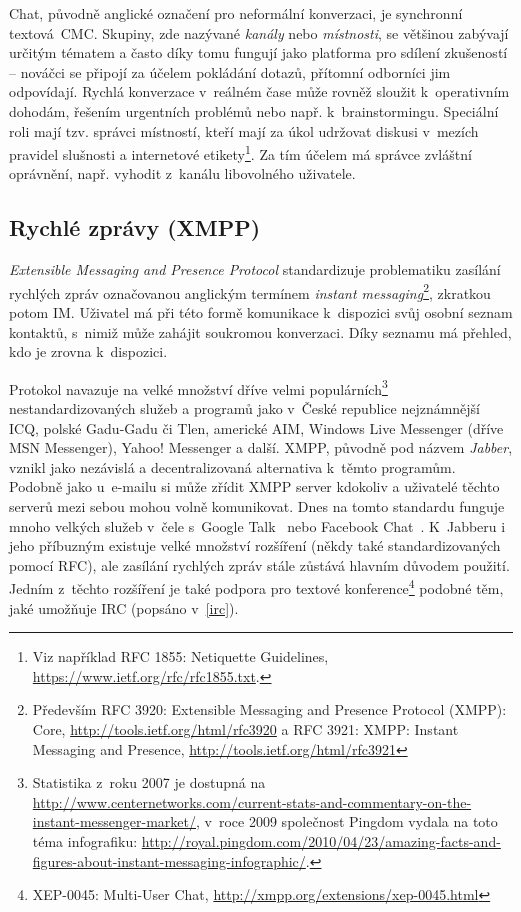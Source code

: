 \documentclass[12pt,oneside,final]{fithesis2}
\begin{document}
Chat, původně anglické označení pro neformální konverzaci, je syn\-chron\-ní tex\-to\-vá~CMC. Skupiny, zde nazývané \emph{kanály} nebo \emph{místnosti}, se většinou zabývají určitým tématem a často díky tomu fungují jako platforma pro sdílení zkušeností -- nováčci se připojí za účelem pokládání dotazů, přítomní odborníci jim odpovídají. Rychlá konverzace v~reálném čase může rovněž sloužit k~operativním dohodám, řešením urgentních problémů nebo např. k~brainstormingu. Speciální roli mají tzv. správci místností, kteří mají za úkol udržovat diskusi v~mezích pravidel slušnosti a internetové etikety\footnote{Viz například RFC 1855: Netiquette Guidelines, \url{https://www.ietf.org/rfc/rfc1855.txt}.}. Za tím účelem má správce zvláštní oprávnění, např. vyhodit z~kanálu libovolného uživatele.

\subsection{Rychlé zprávy (XMPP)}\label{xmpp}
\emph{Extensible Messaging and Presence Protocol} standardizuje problematiku zasílání rychlých zpráv označovanou anglickým termínem \emph{instant messaging}\footnote{Především RFC 3920: Extensible Messaging and Presence Protocol (XMPP): Core, \url{http://tools.ietf.org/html/rfc3920} a RFC 3921: XMPP: Instant Messaging and Presence, \url{http://tools.ietf.org/html/rfc3921}}, zkratkou potom IM. Uživatel má při této formě komunikace k~dispozici svůj osobní seznam kontaktů, s~nimiž může zahájit soukromou konverzaci. Díky seznamu má přehled, kdo je zrovna k~dispozici.

Protokol navazuje na velké množství dříve velmi populárních\footnote{Statistika z~roku 2007 je dostupná na \url{http://www.centernetworks.com/current-stats-and-commentary-on-the-instant-messenger-market/}, v~roce 2009 společnost Pingdom vydala na toto téma infografiku: \url{http://royal.pingdom.com/2010/04/23/amazing-facts-and-figures-about-instant-messaging-infographic/}.} nestandardizovaných služeb a programů jako v~České republice nejznámnější ICQ, polské Gadu-Gadu či Tlen, americké AIM, Windows Live Messenger (dříve MSN Messenger), Yahoo! Messenger a další. XMPP, původně pod názvem \emph{Jabber}, vznikl jako nezávislá a decentralizovaná alternativa k~těmto programům. Podobně jako u~e-mailu si může zřídit XMPP server kdokoliv a uživatelé těchto serverů mezi sebou mohou volně komunikovat. Dnes na tomto standardu funguje mnoho velkých služeb v~čele s~Google Talk~\cite{bau2005google} nebo Facebook Chat~\cite{reiss2010facebook}. K~Jabberu i jeho příbuzným existuje velké množství rozšíření (někdy také standardizovaných pomocí RFC), ale zasílání rychlých zpráv stále zůstává hlavním důvodem použití. Jedním z~těchto rozšíření je také podpora pro textové konference\footnote{XEP-0045: Multi-User Chat, \url{http://xmpp.org/extensions/xep-0045.html}} podobné těm, jaké umožňuje IRC (popsáno v~\ref{irc}).
\end{document}

